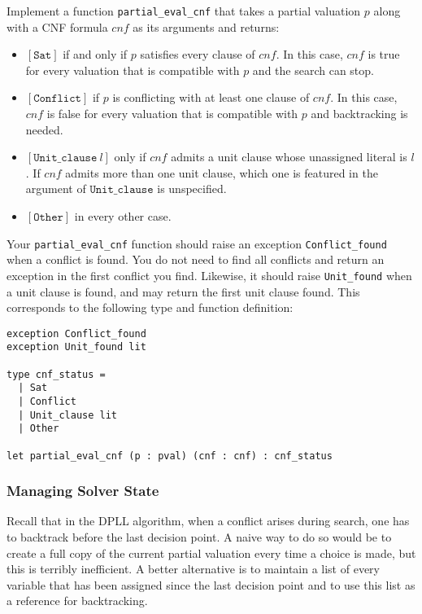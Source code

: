 \documentclass[11pt]{article}
\begin{document}
\begin{task}[15 pts] 
Implement a function \verb|partial_eval_cnf| that takes a partial valuation $p$ along with a CNF formula $cnf$ as its arguments and returns:
\begin{itemize}
\setlength\itemsep{0em}
\item $[\texttt{Sat}]$ if and only if $p$ satisfies every clause of $cnf$.
In this case, $cnf$ is true for every valuation that is compatible
with $p$ and the search can stop.
\item $[\texttt{Conflict}]$ if $p$ is conflicting with at least one clause of $cnf$. In this case, $cnf$ is false for every valuation that is compatible with $p$ and backtracking is needed.
\item $[\texttt{Unit\_clause}\ l]$ only if $cnf$ admits a unit clause whose unassigned literal is $l$. If $cnf$ admits more than one unit clause, which one is featured in the argument of $\texttt{Unit\_clause}$ is unspecified.
\item $[\texttt{Other}]$ in every other case.
\end{itemize}
Your \texttt{partial\_eval\_cnf} function should raise an exception \texttt{Conflict\_found} when a conflict is found. You do not need to find all conflicts and return an exception in the first conflict you find.
Likewise, it should raise \texttt{Unit\_found} when a unit clause is found, and may return the first unit clause found.
This corresponds to the following type and function definition:
\begin{lstlisting}
exception Conflict_found
exception Unit_found lit

type cnf_status =
  | Sat
  | Conflict
  | Unit_clause lit
  | Other

let partial_eval_cnf (p : pval) (cnf : cnf) : cnf_status
\end{lstlisting}
\end{task}

\subsubsection*{Managing Solver State}

Recall that in the DPLL algorithm, when a conflict arises during search, one has to backtrack before the last decision point. 
A naive way to do so would be to create a full copy of the current partial valuation every time a choice is made, but this
is terribly inefficient. 
A better alternative is to maintain a list of every variable that has been assigned since the last decision point and to use this list as a reference for backtracking.
\end{document}

